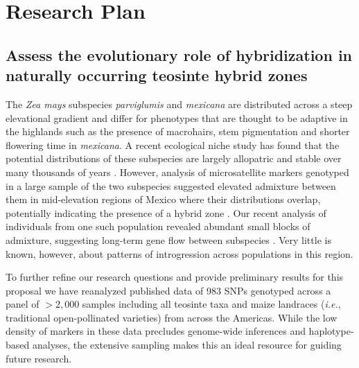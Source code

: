 \section*{Research Plan}

\subsection{Assess the evolutionary role of hybridization in naturally occurring teosinte hybrid zones}
\label{ss:hybrids}

The \emph {Zea mays} subspecies \emph{parviglumis} and \emph{mexicana} are distributed across a steep elevational gradient and differ for phenotypes that are thought to be adaptive in the highlands such as the presence of macrohairs, stem pigmentation and shorter flowering time in \emph{mexicana}.
A recent ecological niche study has found that the potential distributions of these subspecies are largely allopatric and stable over many thousands of years \citep{hufford2012inferences}.
However, analysis of microsatellite markers genotyped in a large sample of the two subspecies suggested elevated admixture between them in mid-elevation regions of Mexico where their distributions overlap, potentially indicating the presence of a hybrid zone \citep{Fukunaga2005}.  
Our recent analysis of individuals from one such population revealed abundant small blocks of admixture, suggesting long-term gene flow between subspecies \citep{Pyhajarvi2013}.  
Very little is known, however, about patterns of introgression across populations in this region.

To further refine our research questions and provide preliminary results for this proposal we have reanalyzed published data \citep{Fang2012} of 983 SNPs genotyped across a panel of $>2,000$ samples including all teosinte taxa and maize landraces (\emph{i.e.}, traditional open-pollinated varieties) from across the Americas.
While the low density of markers in these data precludes genome-wide inferences and haplotype-based analyses, the extensive sampling makes this an ideal resource for guiding future research.

